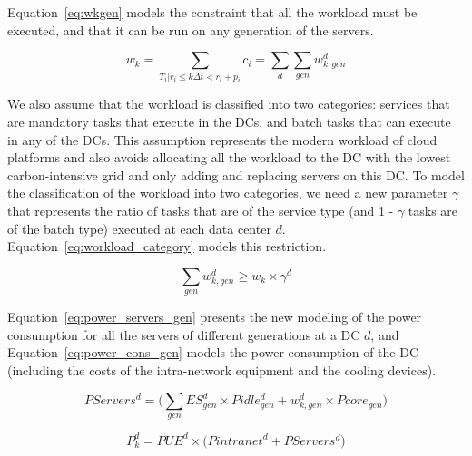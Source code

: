 Equation~\eqref{eq:wkgen} models the constraint that all the workload must be executed, and that it can be run on any generation of the servers.

\begin{equation} \label{eq:wkgen}
    w_k = \sum_{T_i|r_i\leq k\Delta t<r_i+p_i} c_i = \sum_d \sum_{gen} w_{k,gen}^d
\end{equation}

We also assume that the workload is classified into two categories: services that are mandatory tasks that execute in the DCs, and batch tasks that can execute in any of the DCs. This assumption represents the modern workload of cloud platforms and also avoids allocating all the workload to the DC with the lowest carbon-intensive grid and only adding and replacing servers on this DC. To model the classification of the workload into two categories, we need a new parameter $\gamma$ that represents the ratio of tasks that are of the service type (and 1 - $\gamma$ tasks are of the batch type) executed at each data center $d$. Equation~\eqref{eq:workload_category} models this restriction.

\begin{equation} \label{eq:workload_category}
 \sum_{gen}  w_{k,gen}^d \geq  w_k \times \gamma^d
\end{equation}


Equation~\eqref{eq:power_servers_gen} presents the new modeling of the power consumption for all the servers of different generations at a DC $d$, and Equation~\eqref{eq:power_cons_gen} models the power consumption of the DC (including the costs of the intra-network equipment and the cooling devices).


\begin{equation} \label{eq:power_servers_gen}
   PServers^d  =  \big(\sum_{gen} ES_{gen}^d \times  Pidle_{gen}^d + w^d_{k,gen}  \times  Pcore_{gen} \big)
\end{equation}


\begin{equation} \label{eq:power_cons_gen}
   P^d_k  = PUE^d \times \big(Pintranet^d + PServers^d\big)
\end{equation}

